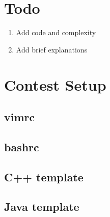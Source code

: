 \documentclass[10pt,twocolumn,oneside]{article} %
\begin{document}
 


\pagestyle{fancy}
\fancyhead[R]{\thepage}

\fancyfoot[C]{\today}
\fancyfoot[R]{\thepage}

\scriptsize
\tableofcontents
\newpage


\section{Todo}
\begin{enumerate}
\item Add code and complexity
\item Add brief explanations
\end{enumerate}


\section{Contest Setup}

\subsection{vimrc}


\subsection{bashrc}


\newpage

\subsection{C++ template}


\subsection{Java template}


\newpage
\end{document}
